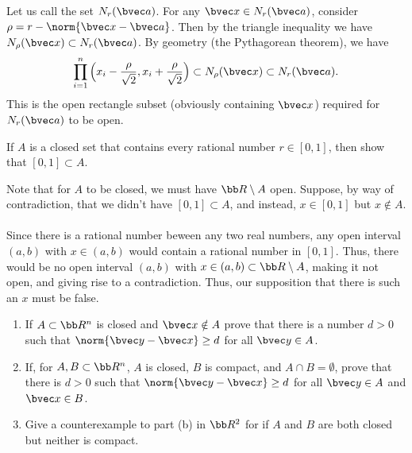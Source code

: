 \documentclass[12pt, letterpaper]{hmcpset}
\begin{document}
\begin{solution}
	Let us call the set $N_r(\bvec a)$. For any $\bvec x \in N_r(\bvec a)$, consider $\rho = r - \norm{\bvec x - \bvec a}$. Then by the triangle inequality we have $N_\rho(\bvec x) \subset N_r(\bvec a)$. By geometry (the Pythagorean theorem), we have
	\[
		\prod_{i = 1}^n \Big ( x_i - \frac{\rho}{\sqrt 2}, x_i + \frac{\rho}{\sqrt 2} \Big ) \subset N_\rho(\bvec x) \subset N_r(\bvec a).
	\]
	This is the open rectangle subset (obviously containing $\bvec x$) required for $N_r(\bvec a)$ to be open.
\end{solution}

\pagebreak

\begin{problem}[19]
	If $A$ is a closed set that contains every rational number $r \in [0, 1]$, then show that $[0, 1] \subset A$.
\end{problem}

\begin{solution}
	Note that for $A$ to be closed, we must have $\bb R \setminus A$ open. Suppose, by way of contradiction, that we didn't have $[0, 1] \subset A$, and instead, $x \in [0, 1]$ but $x \notin A$. \\\\
	Since there is a rational number beween any two real numbers, any open interval $(a, b)$ with $x \in (a, b)$ would contain a rational number in $[0, 1]$. Thus, there would be no open interval $(a, b)$ with $x \in (a, b) \subset \bb R \setminus A$, making it not open, and giving rise to a contradiction. Thus, our supposition that there is such an $x$ must be false.
\end{solution}

\pagebreak

\begin{problem}[21]
	\begin{enumerate}
		\item If $A \subset \bb R^n$ is closed and $\bvec x \notin A$ prove that there is a number $d > 0$ such that $\norm{\bvec y - \bvec x} \ge d$ for all $\bvec y \in A$.
		\item If, for $A, B \subset \bb R^n$, $A$ is closed, $B$ is compact, and $A \cap B = \emptyset$, prove that there is $d > 0$ such that $\norm{\bvec y - \bvec x} \ge d$ for all $\bvec y \in A$ and $\bvec x \in B$.
		\item Give a counterexample to part (b) in $\bb R^2$ for if $A$ and $B$ are both closed but neither is compact.
	\end{enumerate}
\end{problem}
\end{document}
